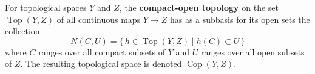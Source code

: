 For topological spaces $Y$ and $Z$, the \textbf{compact-open topology} on the set $\operatorname{Top}(Y, Z)$ of all continuous maps $Y \to Z$ has as a subbasis for its open sets the collection
$$N(C, U) = \{\, h \in \operatorname{Top}(Y, Z) \mid h(C) \subset U \,\}$$
where $C$ ranges over all compact subsets of $Y$ and $U$ ranges over all open subsets of $Z$. The resulting topological space is denoted $\operatorname{Cop}(Y, Z)$.
